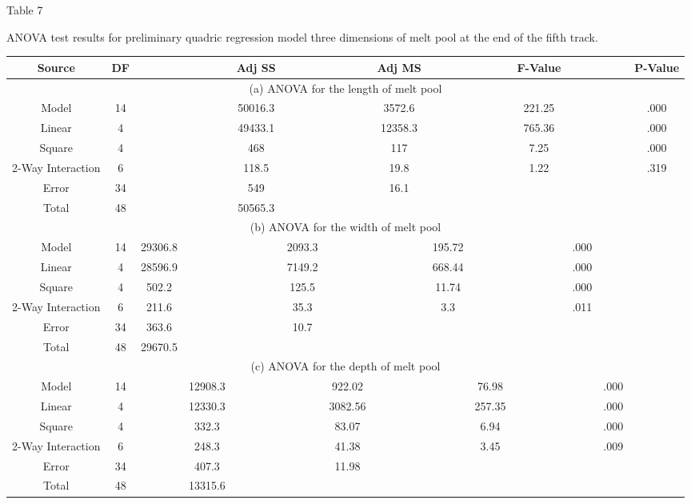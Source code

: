 \documentclass[10pt]{article}
\begin{document}
Table 7

ANOVA test results for preliminary quadric regression model three dimensions of melt pool at the end of the fifth track.

\begin{center}
\begin{tabular}{|c|c|c|c|c|c|c|c|c|c|c|c|c|c|}
\hline
Source & DF &  &  & Adj SS &  &  & Adj MS &  &  & F-Value &  &  & P-Value \\
\hline
\multicolumn{14}{|c|}{(a) ANOVA for the length of melt pool} \\
\hline
Model & 14 &  &  & 50016.3 &  &  & 3572.6 &  &  & 221.25 &  &  & .000 \\
\hline
Linear & 4 &  &  & 49433.1 &  &  & 12358.3 &  &  & 765.36 &  &  & .000 \\
\hline
Square & 4 &  &  & 468 &  &  & 117 &  &  & 7.25 &  &  & .000 \\
\hline
2-Way Interaction & 6 &  &  & 118.5 &  &  & 19.8 &  &  & 1.22 &  &  & .319 \\
\hline
Error & 34 &  &  & 549 &  &  & 16.1 &  &  &  &  &  &  \\
\hline
Total & 48 &  &  & 50565.3 &  &  &  &  &  &  &  &  &  \\
\hline
\multicolumn{14}{|c|}{(b) ANOVA for the width of melt pool} \\
\hline
Model & 14 & 29306.8 &  &  & 2093.3 &  &  & 195.72 &  &  & .000 &  &  \\
\hline
Linear & 4 & 28596.9 &  &  & 7149.2 &  &  & 668.44 &  &  & .000 &  &  \\
\hline
Square & 4 & 502.2 &  &  & 125.5 &  &  & 11.74 &  &  & .000 &  &  \\
\hline
2-Way Interaction & 6 & 211.6 &  &  & 35.3 &  &  & 3.3 &  &  & .011 &  &  \\
\hline
Error & 34 & 363.6 &  &  & 10.7 &  &  &  &  &  &  &  &  \\
\hline
Total & 48 & 29670.5 &  &  &  &  &  &  &  &  &  &  &  \\
\hline
\multicolumn{14}{|c|}{(c) ANOVA for the depth of melt pool} \\
\hline
Model & 14 &  & 12908.3 &  &  & 922.02 &  &  & 76.98 &  &  & .000 &  \\
\hline
Linear & 4 &  & 12330.3 &  &  & 3082.56 &  &  & 257.35 &  &  & .000 &  \\
\hline
Square & 4 &  & 332.3 &  &  & 83.07 &  &  & 6.94 &  &  & .000 &  \\
\hline
2-Way Interaction & 6 &  & 248.3 &  &  & 41.38 &  &  & 3.45 &  &  & .009 &  \\
\hline
Error & 34 &  & 407.3 &  &  & 11.98 &  &  &  &  &  &  &  \\
\hline
Total & 48 &  & 13315.6 &  &  &  &  &  &  &  &  &  &  \\
\hline
\end{tabular}
\end{center}
\end{document}
